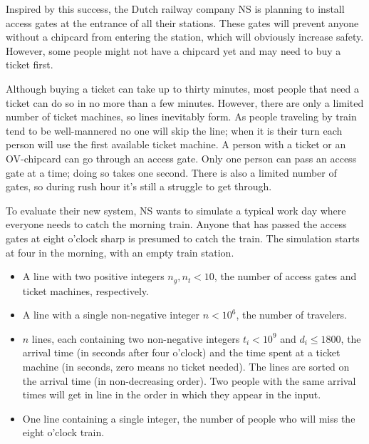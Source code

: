 


{\StandaardZin}
Inspired by this success, the Dutch railway company NS is planning to install access gates at the entrance of all their stations.
These gates will prevent anyone without a chipcard from entering the station, which will obviously increase safety.
However, some people might not have a chipcard yet and may need to buy a ticket first.

Although buying a ticket can take up to thirty minutes, most people that need a ticket can do so in no more than a few minutes.
However, there are only a limited number of ticket machines, so lines inevitably form.
As people traveling by train tend to be well-mannered no one will skip the line;
when it is their turn each person will use the first available ticket machine.
A person with a ticket or an OV-chipcard can go through an access gate.
Only one person can pass an access gate at a time; doing so takes one second.
There is also a limited number of gates, so during rush hour it's still a struggle to get through.

To evaluate their new system, NS wants to simulate a typical work day where everyone needs to catch the morning train.
Anyone that has passed the access gates at eight o'clock sharp is presumed to catch the train.
The simulation starts at four in the morning, with an empty train station.


\Input
\begin{itemize}
 \item A line with two positive integers $n_g, n_t < 10$, the number of access gates and ticket machines, respectively.
 
 \item A line with a single non-negative integer $n < 10^6$, the number of travelers.
 
 \item $n$ lines, each containing two non-negative integers $t_i < 10^9$ and $d_i \le 1800$, the arrival time (in seconds after four o'clock) and the time spent at a ticket machine (in seconds, zero means no ticket needed). The lines are sorted on the arrival time (in non-decreasing order). Two people with the same arrival times will get in line in the order in which they appear in the input. %
\end{itemize}

\Output
\begin{itemize}
 \item One line containing a single integer, the number of people who will miss the eight o'clock train.
\end{itemize}

\vfill %
\Example
